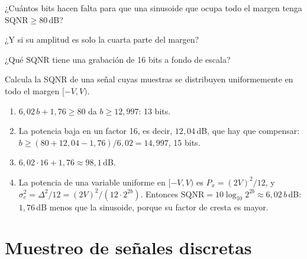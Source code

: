 \documentclass[11pt,a4paper]{scrartcl}
\begin{document}
\begin{ejercicio}
  \begin{incisos}[1]
    \item ¿Cuántos bits hacen falta para que una sinusoide que ocupa todo el margen tenga $\mathrm{SQNR}\ge80$\,dB?
    \item ¿Y si su amplitud es solo la cuarta parte del margen?
    \item ¿Qué SQNR tiene una grabación de 16 bits a fondo de escala?
    \item Calcula la SQNR de una señal cuyas muestras se distribuyen uniformemente en todo el margen $[-V,V)$.
  \end{incisos}
\end{ejercicio}
\begin{solucion}
  \begin{enumerate}[label=\alph*)]
    \item $6{,}02\,b+1{,}76\ge80$ da $b\ge12{,}997$: 13 bits.
    \item La potencia baja en un factor 16, es decir, $12{,}04$\,dB, que hay que compensar: $b\ge(80+12{,}04-1{,}76)/6{,}02=14{,}997$, 15 bits.
    \item $6{,}02\cdot16+1{,}76\approx98{,}1$\,dB.
    \item La potencia de una variable uniforme en $[-V,V)$ es $P_x=(2V)^2/12$, y $\sigma_e^2=\Delta^2/12=(2V)^2/(12\cdot2^{2b})$. Entonces $\mathrm{SQNR}=10\log_{10}2^{2b}\approx6{,}02\,b$\,dB: $1{,}76$\,dB menos que la sinusoide, porque su factor de cresta es mayor.
  \end{enumerate}
\end{solucion}

\section*{Muestreo de señales discretas}
\end{document}

